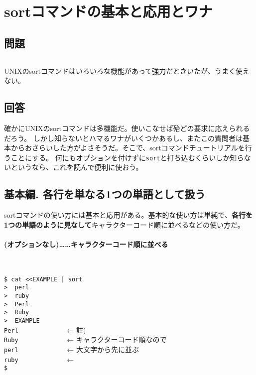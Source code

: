 \section{sortコマンドの基本と応用とワナ}
\label{recipe:sort}

\subsection*{問題}
\noindent
$\!\!\!\!\!$
\begin{grshfboxit}{160.0mm}
	UNIXのsortコマンドはいろいろな機能があって強力だときいたが、うまく使えない。
\end{grshfboxit}

\subsection*{回答}

確かにUNIXのsortコマンドは多機能だ。使いこなせば殆どの要求に応えられるだろう。
しかし知らないとハマるワナがいくつかあるし、またこの質問者は基本からおさらいした方がよさそうだ。そこで、sortコマンドチュートリアルを行うことにする。
何にもオプションを付けずに\verb|sort|と打ち込むくらいしか知らないというなら、これを読んで便利に使おう。

\subsection*{基本編. 各行を単なる1つの単語として扱う}

sortコマンドの使い方には基本と応用がある。基本的な使い方は単純で、\textbf{各行を1つの単語のように見なして}キャラクターコード順に並べるなどの使い方だ。

\paragraph*{(オプションなし)……キャラクターコード順に並べる}　\\
\begin{screen}
	\verb!$ cat <<EXAMPLE | sort! \return \\
	\verb!>  perl! \return \\
	\verb!>  ruby! \return \\
	\verb!>  Perl! \return \\
	\verb!>  Ruby! \return \\
	\verb!>  EXAMPLE! \return \\
	\verb!Perl             !  ← 註) \\
	\verb!Ruby             !  ← キャラクターコード順なので \\
	\verb!perl             !  ← 大文字から先に並ぶ \\
	\verb!ruby             !  ← \\
	\verb!$ !
\end{screen}

